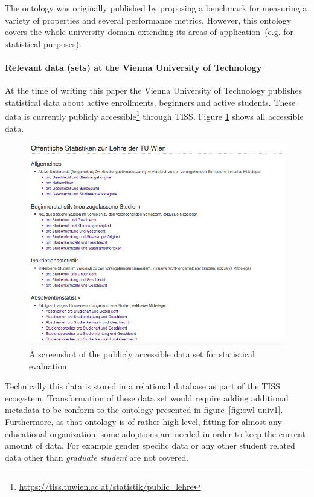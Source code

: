 \documentclass{article}
\begin{document}
The ontology was originally published by \citet{article:university-ontology} proposing a benchmark for measuring a variety of properties and several performance
metrics. However, this ontology covers the whole university domain extending its areas of application~(e.g. for statistical purposes). 

\paragraph{Relevant data (sets) at the Vienna University of Technology}
At the time of writing this paper the Vienna University of Technology publishes statistical data about active enrollments, beginners and active students. These data is currently publicly accessible\footnote{\url{https://tiss.tuwien.ac.at/statistik/public_lehre}} through TISS. Figure \ref{fig:tiss-statistic} shows all accessible data.
\begin{figure}[H]
	\centering \includegraphics*[width=.8\columnwidth]{tiss-statistical-data.png}
	\caption{A screenshot of the publicly accessible data set for statistical evaluation}
	\label{fig:tiss-statistic}
\end{figure}
Technically this data is stored in a relational database as part of the TISS ecosystem. Transformation of these data set would require adding additional metadata to be conform to the ontology presented in figure~\ref{fig:owl-univ1}. Furthermore, as that ontology is of rather high level, fitting for almost any educational organization, some adoptions are needed in order to keep the current amount of data. For example gender specific data or any other student related data other than \textit{graduate student} are not covered. 
\end{document}
